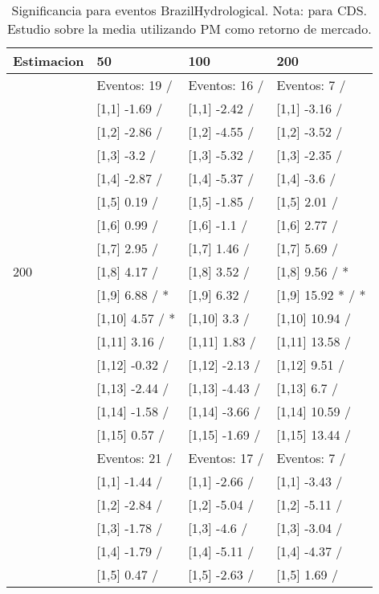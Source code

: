 \begin{table}

\caption{Significancia para eventos BrazilHydrological. Nota: para CDS. Estudio sobre la media utilizando PM como retorno de mercado.}
\centering
\begin{tabular}[t]{llll}
\toprule
Estimacion & 50 & 100 & 200\\
\midrule
 & Eventos:  19 / & Eventos:  16 / & Eventos:  7 /\\
 & {}[1,1] -1.69  / & {}[1,1] -2.42  / & {}[1,1] -3.16  /\\
 & {}[1,2] -2.86  / & {}[1,2] -4.55  / & {}[1,2] -3.52  /\\
 & {}[1,3] -3.2  / & {}[1,3] -5.32  / & {}[1,3] -2.35  /\\
 & {}[1,4] -2.87  / & {}[1,4] -5.37  / & {}[1,4] -3.6  /\\
\addlinespace
 & {}[1,5] 0.19  / & {}[1,5] -1.85  / & {}[1,5] 2.01  /\\
 & {}[1,6] 0.99  / & {}[1,6] -1.1  / & {}[1,6] 2.77  /\\
 & {}[1,7] 2.95  / & {}[1,7] 1.46  / & {}[1,7] 5.69  /\\
200 & {}[1,8] 4.17  / & {}[1,8] 3.52  / & {}[1,8] 9.56  / *\\
 & {}[1,9] 6.88  / * & {}[1,9] 6.32  / & {}[1,9] 15.92 * / *\\
\addlinespace
 & {}[1,10] 4.57  / * & {}[1,10] 3.3  / & {}[1,10] 10.94  /\\
 & {}[1,11] 3.16  / & {}[1,11] 1.83  / & {}[1,11] 13.58  /\\
 & {}[1,12] -0.32  / & {}[1,12] -2.13  / & {}[1,12] 9.51  /\\
 & {}[1,13] -2.44  / & {}[1,13] -4.43  / & {}[1,13] 6.7  /\\
 & {}[1,14] -1.58  / & {}[1,14] -3.66  / & {}[1,14] 10.59  /\\
\addlinespace
 & {}[1,15] 0.57  / & {}[1,15] -1.69  / & {}[1,15] 13.44  /\\
 & Eventos:  21 / & Eventos:  17 / & Eventos:  7 /\\
 & {}[1,1] -1.44  / & {}[1,1] -2.66  / & {}[1,1] -3.43  /\\
 & {}[1,2] -2.84  / & {}[1,2] -5.04  / & {}[1,2] -5.11  /\\
 & {}[1,3] -1.78  / & {}[1,3] -4.6  / & {}[1,3] -3.04  /\\
\addlinespace
 & {}[1,4] -1.79  / & {}[1,4] -5.11  / & {}[1,4] -4.37  /\\
 & {}[1,5] 0.47  / & {}[1,5] -2.63  / & {}[1,5] 1.69  /\\

\end{tabular}
\end{table}
